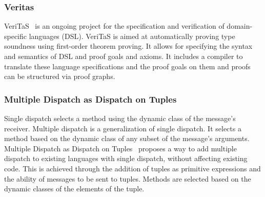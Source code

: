 \begin{minipage}{0.9\textwidth}
\subsubsection{Veritas}
VeriTaS~\cite{veritas1,veritas2} is an ongoing project
for the specification and verification
of domain-specific languages (DSL).
VeriTaS is aimed at automatically proving type soundness 
using first-order theorem proving.
It allows for specifying
the syntax and semantics of DSL
and proof goals and axioms.
It includes a compiler to translate
these language specifications and the proof goals on them
and proofs can be structured via proof graphs.
\\
\subsubsection{Multiple Dispatch as Dispatch on Tuples}
Single dispatch selects a method using
the dynamic class of the message's receiver.
Multiple dispatch is a generalization of single dispatch.
It selects a method based on the dynamic class
of any subset of the message's arguments.
Multiple Dispatch as Dispatch on Tuples~\cite{multidispatch-tuple}
proposes a way to add multiple dispatch
to existing languages with single dispatch,
without affecting existing code.
This is achieved through the addition
of tuples as primitive expressions
and the ability of messages to be sent to tuples.
Methods are selected based on the dynamic classes
of the elements of the tuple.
\end{minipage}




